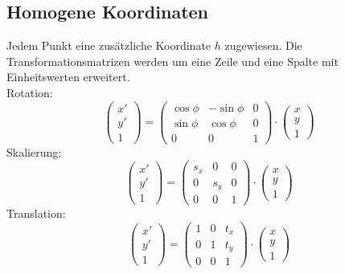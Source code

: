 \documentclass{report}
\begin{document}
\subsection{Homogene Koordinaten}
Jedem Punkt eine zusätzliche Koordinate $h$ zugewiesen. Die Transformationsmatrizen werden um eine Zeile und eine Spalte mit Einheitswerten erweitert.\\Rotation:
\begin{equation}\left(\begin{matrix}x'\\y'\\1\end{matrix}\right) = \left(\begin{matrix}\cos{\phi} & -\sin{\phi} & 0\\ \sin{\phi} & \cos{\phi} & 0 \\ 0 & 0 &  1\end{matrix}\right) \cdot \left(\begin{matrix}x\\y\\1\end{matrix}\right) \end{equation}
Skalierung:
\begin{equation}\left(\begin{matrix}x'\\y'\\1\end{matrix}\right) = \left(\begin{matrix}s_x & 0 & 0 \\ 0 & s_y & 0 \\ 0 & 0 & 1\end{matrix}\right) \cdot \left(\begin{matrix}x\\y\\1\end{matrix}\right) \end{equation}
Translation:
\begin{equation}\left(\begin{matrix}x'\\y'\\1\end{matrix}\right) = \left(\begin{matrix}1 & 0 & t_x \\ 0 & 1 & t_y \\ 0 & 0 & 1\end{matrix}\right) \cdot \left(\begin{matrix}x\\y\\1\end{matrix}\right) \end{equation}
\end{document}
